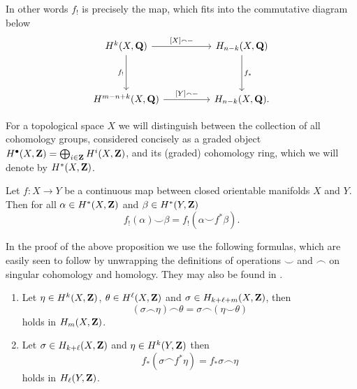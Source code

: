 \begin{remark}
    In other words $f_!$ is precisely the map, which fits into the commutative diagram below
    \[\begin{tikzcd}
        \cohom{k}{X}{\Q} && H_{n-k}(X, \Q) \\
        \\
        \cohom{m-n+k}{X}{\Q} && H_{n-k}(X, \Q).
        \arrow["{[X] \smallfrown -}", from=1-1, to=1-3]
        \arrow["{f_!}"', from=1-1, to=3-1]
        \arrow["{f_*}", from=1-3, to=3-3]
        \arrow["{[Y] \smallfrown -}", from=3-1, to=3-3]
    \end{tikzcd}\]
\end{remark}

\begin{remark}
    For a topological space $X$ we will distinguish between the collection of all cohomology groups, considered concisely as a graded object $H^{\bullet}(X, \mathbf Z) = \bigoplus_{i\in \mathbf Z} H^{i}(X, \mathbf Z)$, and its (graded) cohomology ring, which we will denote by $H^{*}(X, \mathbf Z)$.
\end{remark}

\begin{proposition}
    \label{cohomological projection formula}
    Let $f \colon X \to Y$ be a continuous map between closed orientable manifolds $X$ and $Y$. Then for all $\alpha \in H^{*}(X, \mathbf Z)$ and $\beta \in H^{*}(Y, \mathbf Z)$
    \begin{equation}
        \label{eq: cohomological projection formula}
        f_!(\alpha) \smallsmile \beta = f_!(\alpha \smallsmile f^*\beta).
    \end{equation}
\end{proposition}

\begin{remark}
    In the proof of the above proposition we use the following formulas, which are easily seen to follow by unwrapping the definitions of operations $\smallsmile$ and $\smallfrown$ on singular cohomology and homology. They may also be found in \cite[\S VI, Theorem 5.2]{Bredon1993}.
    \begin{enumerate}[label = (\roman*)]
        \item{Let $\eta \in H^{k}(X, \mathbf Z)$, $\theta \in H^{\ell}(X, \mathbf Z)$ and $\sigma \in H_{k+\ell+m}(X, \mathbf Z)$, then 
        \[
            (\sigma \smallfrown \eta) \smallfrown \theta = 
            \sigma \smallfrown (\eta \smallsmile \theta)
        \]
        holds in $H_m(X, \mathbf Z)$.}
        \item{Let $\sigma \in H_{k + \ell}(X, \mathbf Z)$ and $\eta \in H^{k}(Y, \mathbf Z)$ then 
        \[
            f_*(\sigma \smallfrown f^*\eta) = f_*\sigma \smallfrown \eta
        \]
        holds in $H_\ell(Y, \mathbf Z)$.
        }
    \end{enumerate}
\end{remark}

